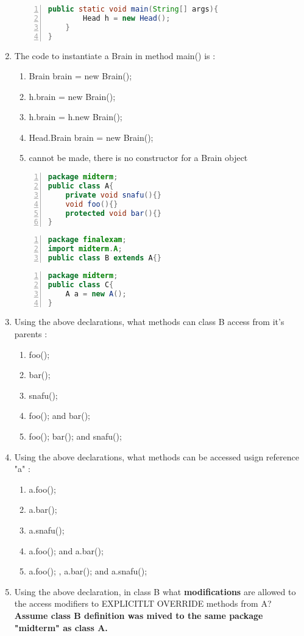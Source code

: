 \documentclass{article}
\begin{document}
\begin{enumerate}
\begin{lstlisting}[language=Java, numbers=left]
	public static void main(String[] args){
		Head h = new Head();
	}
}			
	\end{lstlisting}
	\item The code to instantiate a Brain in method main() is :
	\begin{enumerate}
		\item Brain brain = new Brain();
		\item h.brain = new Brain();
		\item h.brain = h.new Brain();
		\item Head.Brain brain = new Brain();
		\item cannot be made, there is no constructor for a Brain object
	\end{enumerate}
	\begin{lstlisting}[language=Java, numbers=left]
package midterm;
public class A{
	private void snafu(){}
	void foo(){}
	protected void bar(){}
}
	\end{lstlisting}
	\hrulefill
	\hrulefill
	\begin{lstlisting}[language=Java, numbers=left]
package finalexam;
import midterm.A;
public class B extends A{}
	\end{lstlisting}
	\hrulefill
	\hrulefill
	\begin{lstlisting}[language=Java, numbers=left]
package midterm;
public class C{
	A a = new A();
}
	\end{lstlisting}
	\item Using the above declarations, what methods can class B access from it's parents :
	\begin{enumerate}
		\item foo();
		\item bar();
		\item snafu();
		\item foo(); and bar();
		\item foo(); bar(); and snafu();
	\end{enumerate}
	\item Using the above declarations, what methods can be accessed usign reference "a" :
	\begin{enumerate}
		\item a.foo();
		\item a.bar();
		\item a.snafu();
		\item a.foo(); and a.bar();
		\item a.foo(); , a.bar(); and a.snafu();
	\end{enumerate}
	\item Using the above declaration, in class B what \textbf{modifications} are allowed to the access modifiers to EXPLICITLT OVERRIDE methods from A? \textbf{Assume class B definition was mived to the same package "midterm" as class A.}

\end{enumerate}
\end{document}
